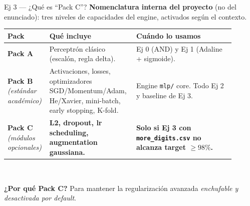 \documentclass[11pt,aspectratio=169]{beamer}
\newcommand{\code}[1]{\texttt{\textcolor{accent}{#1}}}
\begin{document}
\begin{frame}{Ej 3 — ¿Qué es ``Pack C''?}
\small \textbf{Nomenclatura interna del proyecto} (no del enunciado): tres niveles de capacidades del engine, activados según el contexto.\\[0.4em]

\centering\footnotesize
\begin{tabular}{@{}p{0.12\linewidth}p{0.36\linewidth}p{0.42\linewidth}@{}}
\toprule
\textbf{Pack} & \textbf{Qué incluye} & \textbf{Cuándo lo usamos} \\
\midrule
\textbf{Pack A} & Perceptrón clásico (escalón, regla delta). & Ej 0 (AND) y Ej 1 (Adaline + sigmoide). \\
\midrule
\textbf{Pack B} \emph{(estándar académico)} & Activaciones, losses, optimizadores SGD/Momentum/Adam, He/Xavier, mini-batch, early stopping, K-fold. & Engine \code{mlp/} core. Todo Ej 2 y baseline de Ej 3. \\
\midrule
\rowcolor{accent2!15}
\textbf{Pack C} \emph{(módulos opcionales)} & \textbf{L2, dropout, lr scheduling, augmentation gaussiana.} & \textbf{Solo si Ej 3 con \code{more\_digits.csv} no alcanza target $\geq 98\%$.} \\
\bottomrule
\end{tabular}\\[0.5em]

\raggedright\small
\textbf{¿Por qué Pack C?} Para mantener la regularización avanzada \emph{enchufable y desactivada por default}.
\end{frame}
\end{document}
